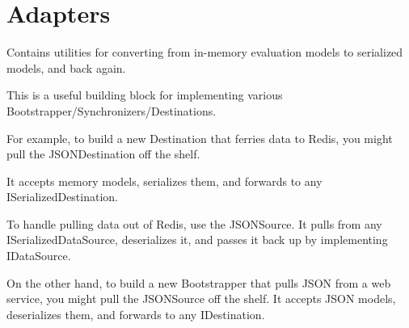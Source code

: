\chapter{Adapters}
\hypertarget{md_src_2data__components_2serialization__adapters_2README}{}\label{md_src_2data__components_2serialization__adapters_2README}
\label{md_src_2data__components_2serialization__adapters_2README_autotoc_md0}%
%
 Contains utilities for converting from in-\/memory evaluation models to serialized models, and back again.

This is a useful building block for implementing various Bootstrapper/\+Synchronizers/\+Destinations.

For example, to build a new Destination that ferries data to Redis, you might pull the {\ttfamily JSONDestination} off the shelf.

It accepts memory models, serializes them, and forwards to any {\ttfamily ISerialized\+Destination}.


\begin{DoxyCode}{0}

\end{DoxyCode}


To handle pulling data out of Redis, use the {\ttfamily JSONSource}. It pulls from any {\ttfamily ISerialized\+Data\+Source}, deserializes it, and passes it back up by implementing {\ttfamily IData\+Source}.


\begin{DoxyCode}{0}

\end{DoxyCode}


On the other hand, to build a new Bootstrapper that pulls JSON from a web service, you might pull the {\ttfamily JSONSource} off the shelf. It accepts JSON models, deserializes them, and forwards to any {\ttfamily IDestination}.


\begin{DoxyCode}{0}

\end{DoxyCode}
 